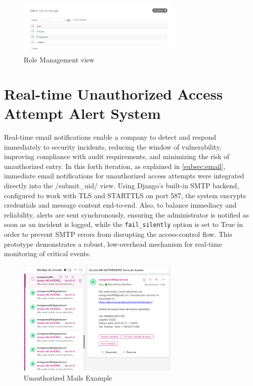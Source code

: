 \begin{figure}[h]
	\centering
	\includegraphics[width=0.7\textwidth]{imaxes/Roles} %
	\caption{Role Management view}
	\label{fig:role_management}
\end{figure}

\section{Real-time Unauthorized Access Attempt Alert System}
Real-time email notifications enable a company to detect and respond immediately to security incidents, reducing the window of vulnerability, improving compliance with audit requirements, and minimizing the risk of unauthorized entry. In this forth iteration, as explained in \ref{subsec:email}, immediate email notifications for unauthorized access attempts were integrated directly into the /submit\_uid/ view. Using Django’s built-in SMTP backend, configured to work with TLS and STARTTLS on port 587, the system encrypts credentials and message content end-to-end. Also, to balance immediacy and reliability, alerts are sent synchronously, ensuring the administrator is notified as soon as an incident is logged, while the \texttt{fail\_silently} option is set to True in order to prevent SMTP errors from disrupting the access-control flow. This prototype demonstrates a robust, low-overhead mechanism for real-time monitoring of critical events.

\begin{figure}[h]
	\centering
	\includegraphics[width=0.7\textwidth]{imaxes/MAIL} %
	\caption{Unauthorized Mails Example}
	\label{fig:unauthorized_mail}
\end{figure}
